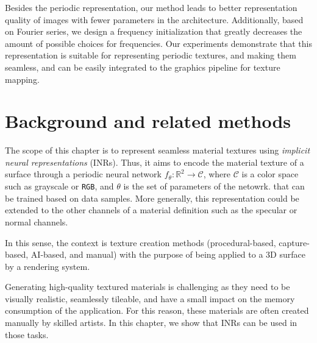 


Besides the periodic representation, our method leads to better representation quality of images with fewer parameters in the architecture. Additionally, based on Fourier series, we design a frequency initialization that greatly decreases the amount of possible choices for frequencies. Our experiments demonstrate that this representation is suitable for representing periodic textures, and making them seamless, and can be easily integrated to the graphics pipeline for texture mapping.


\section{Background and related methods}

The scope of this chapter is to represent seamless material textures using \textit{implicit neural representations} (INRs). Thus, it aims to encode the material texture of a surface through a periodic neural network $f_\theta:\mathbb{R}^2\to \mathcal{C}$, where $\mathcal{C}$ is a color space such as grayscale or \texttt{RGB}, and $\theta$ is the set of parameters of the netowrk. that can be trained based on data samples. More generally, this representation could be extended to the other channels of a material definition such as the specular or normal channels.

In this sense, the context is texture creation methods (procedural-based, capture-based, AI-based, and manual) with the purpose of being applied to a 3D surface by a rendering system.

Generating high-quality textured materials is challenging as they need to be visually realistic, seamlessly tileable, and have a small impact on the memory consumption of the application. For this reason, these materials are often created manually by skilled artists. In this chapter, we show that INRs can be used in those tasks.

